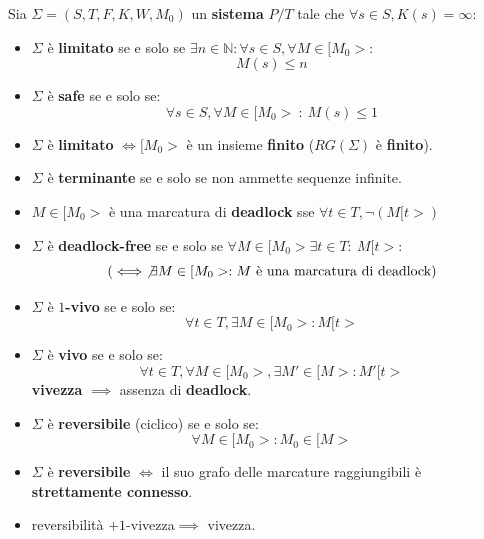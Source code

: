 \begin{osservazione}
    Sia $\Sigma = (S,T,F,K,W,M_0)$ un \textbf{sistema} $P/T$ tale che $\forall s
        \in S, K(s)=\infty$:
    \begin{itemize}
        \item $\Sigma$ è \textbf{limitato} se e solo se $\exists n\in \mathbb{N}:
                  \forall s\in S, \forall M\in [M_0>$:
              \begin{equation*}
                  M(s) \leq n
              \end{equation*}
        \item $\Sigma$ è \textbf{safe} se e solo se:
              \begin{equation*}
                  \forall s \in S, \forall M \in [M_0> \ : \ M(s) \leq 1
              \end{equation*}
        \item $\Sigma$ è \textbf{limitato} $\iff [M_0>$ è un insieme \textbf{finito}
              ($RG(\Sigma)$ è \textbf{finito}).
        \item $\Sigma$ è \textbf{terminante} se e solo se non ammette sequenze infinite.
        \item $M\in [M_0>$ è una marcatura di \textbf{deadlock} sse $\forall t\in
                  T,\lnot(M[t>)$
        \item $\Sigma$ è \textbf{deadlock-free} se e solo se $\forall M \in [M_0>
                  \exists t \in T : \ M[t>$:
              \begin{equation*}
                  (\iff \not\exists M\in [M_0>:M\text{ è una marcatura di deadlock})
              \end{equation*}
        \item $\Sigma$ è $1$\textbf{-vivo} se e solo se:
              \begin{equation*}
                  \forall t\in T,\exists M\in [M_0>:M[t>
              \end{equation*}
        \item $\Sigma$ è \textbf{vivo} se e solo se:
              \begin{equation*}
                  \forall t\in T,\forall M\in [M_0>,\exists M'\in [M>:M'[t>
              \end{equation*}
              \textbf{vivezza} $\implies$ assenza di \textbf{deadlock}.
        \item $\Sigma$ è \textbf{reversibile} (ciclico) se e solo se:
              \begin{equation}
                  \forall M\in [M_0>:M_0\in [M>
              \end{equation}
        \item $\Sigma$ è \textbf{reversibile} $\iff$ il suo grafo delle marcature
              raggiungibili è \textbf{strettamente connesso}.
        \item reversibilità $+ 1$-vivezza$\implies$ vivezza.
    \end{itemize}
\end{osservazione}

